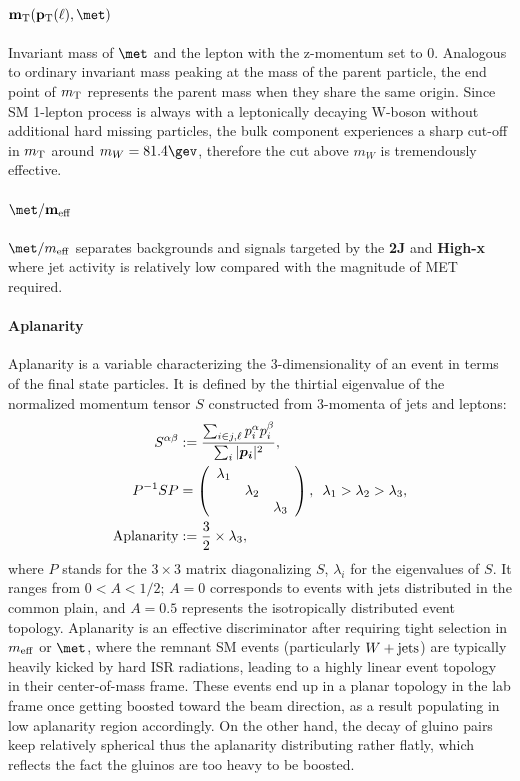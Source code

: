 \paragraph{${\bf \mtFull}$} 
Invariant mass of $\met$ and the lepton with the z-momentum set to 0.
Analogous to ordinary invariant mass peaking at the mass of the parent particle, the end point of $m_{\mathrm{T}}$ represents the parent mass when they share the same origin.
Since SM 1-lepton process is always with a leptonically decaying W-boson without additional hard missing particles, the bulk component experiences a sharp cut-off in $m_{\mathrm{T}}$ around $m_W = 81.4 \gev$, 
therefore the cut above $m_W$ is tremendously effective.


\paragraph{${\bf \met/\meffInc}$}
$\met/\meffInc$ separates backgrounds and signals targeted by the \textbf{2J} and \textbf{High-x} where jet activity is relatively low compared with the magnitude of MET required.


\paragraph{Aplanarity}
Aplanarity \cite{Aplanarity} is a variable characterizing the 3-dimensionality of an event in terms of the final state particles. 
It is defined by the thirtial eigenvalue of the normalized momentum tensor $S$ constructed from 3-momenta of jets and leptons:
\begin{align}
  S^{\alpha \beta} & := \frac{\sum_{i \in j,\ell} p_i^{\alpha} p_i^{\beta} }{\sum_i |\bm{p_i}|^2 }, \nonumber \\ 
  P^{-1}SP & = \left(
  \begin{array}{c c c }
    \lambda_1  & & \\
    & \lambda_2 & \\
    & & \lambda_3 \\
  \end{array}
  \right), \,\,\, \lambda_1 > \lambda_2 > \lambda_3, \nonumber \\
  \mathrm{Aplanarity} & := \frac {3}{2} \times \lambda_3,
\end{align}
where $P$ stands for the $3\times3$ matrix diagonalizing $S$, $\lambda_i$ for the eigenvalues of $S$.
It ranges from $0<A<1/2$; $A=0$ corresponds to events with jets distributed in the common plain, and $A=0.5$ represents the isotropically distributed event topology.
Aplanarity is an effective discriminator after requiring tight selection in $m_{\mathrm{eff}}$ or $\met$, where the remnant SM events (particularly $W+\mathrm{jets}$) are typically heavily kicked by hard ISR radiations, leading to a highly linear event topology in their center-of-mass frame. These events end up in a planar topology in the lab frame once getting boosted toward the beam direction, as a result populating in low aplanarity region accordingly. 
On the other hand, the decay of gluino pairs keep relatively spherical thus the aplanarity distributing rather flatly, which reflects the fact the gluinos are too heavy to be boosted.


